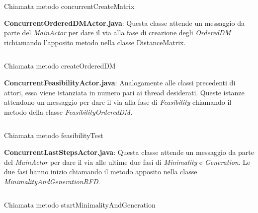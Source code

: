 \begin{listing}[H]
	\inputminted[]{java}{Codici/ConcurrentDMActor.java}
	\caption{Chiamata metodo concurrentCreateMatrix}
	\label{Code:9}
\end{listing}
\textbf{ConcurrentOrderedDMActor.java}:
Questa classe attende un messaggio da parte del \emph{MainActor} per dare il via alla fase di creazione degli \emph{OrderedDM} richiamando l'apposito metodo nella classe DistanceMatrix.\\
\begin{listing}[H]
	\inputminted[]{java}{Codici/ConcurrentOrderedDMActor.java}
	\caption{Chiamata metodo createOrderedDM}
	\label{Code:10}
\end{listing}
\textbf{ConcurrentFeasibilityActor.java}:
Analogamente alle classi precedenti di attori, essa viene istanziata in numero pari ai thread desiderati.
Queste istanze attendono un messaggio per dare il via alla fase di \emph{Feasibility} chiamando il metodo della classe \emph{FeasibilityOrderedDM}.\\
\begin{listing}[H]
	\inputminted[]{java}{Codici/ConcurrentFeasibilityActor.java}
	\caption{Chiamata metodo feasibilityTest}
	\label{Code:11}
\end{listing}
\textbf{ConcurrentLastStepsActor.java}:
Questa classe attende un messaggio da parte del \emph{MainActor} per dare il via alle ultime due fasi di \emph{Minimality} e \emph{Generation}.
Le due fasi hanno inizio chiamando il metodo apposito nella classe \emph{MinimalityAndGenerationRFD}.
\begin{listing}[H]
	\inputminted[]{java}{Codici/ConcurrentLastStepsActor.java}
	\caption{Chiamata metodo startMinimalityAndGeneration}
	\label{Code:12}
\end{listing}
